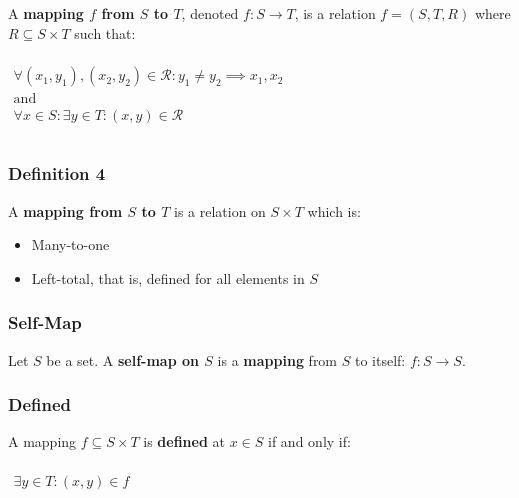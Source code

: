 A \textbf{mapping $f$ from $S$ to $T$}, denoted $f: S \to T$, is a
relation $f = (S, T, R)$ where $R \subseteq S \times T$ such that:

\begin{math}
  \begin{array}{l}
    \\
    \forall (x_1, y_1), (x_2, y_2) \in \mathcal{R}: y_1 \neq y_2 \implies x_1, x_2 \\
    \text{and} \\
    \forall x \in S: \exists y \in T: (x, y) \in \mathcal{R} \\
    \\
  \end{array}
\end{math}

\subsubsection{Definition 4}

A \textbf{mapping from $S$ to $T$} is a relation on $S \times T$ which is:

\begin{itemize}
\item Many-to-one
\item Left-total, that is, defined for all elements in $S$
\end{itemize}

\subsubsection{Self-Map}
\label{sec:self-map}

Let $S$ be a set. A \textbf{self-map on $S$} is a \textbf{mapping}
from $S$ to itself: $f: S \to S$.

\subsubsection{Defined}
\label{sec:defined}

A mapping $f \subseteq S \times T$ is \textbf{defined} at $x \in S$ if
and only if:

\begin{math}
  \begin{array}{c}
    \\
    \exists y \in T: (x, y) \in f\\
    \\
  \end{array}
\end{math}


